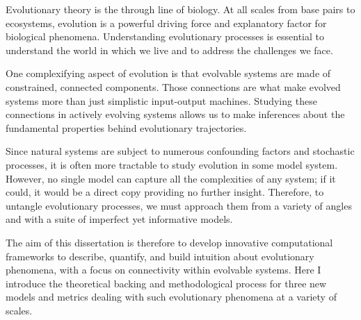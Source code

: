 Evolutionary theory is the through line of biology. At all scales from base pairs to ecosystems, evolution is a powerful driving force and explanatory factor for biological phenomena. Understanding evolutionary processes is essential to understand the world in which we live and to address the challenges we face.

One complexifying aspect of evolution is that evolvable systems are made of constrained, connected components. Those connections are what make evolved systems more than just simplistic input-output machines. Studying these connections in actively evolving systems allows us to make inferences about the fundamental properties behind evolutionary trajectories.

Since natural systems are subject to numerous confounding factors and stochastic processes, it is often more tractable to study evolution in some model system. However, no single model can capture all the complexities of any system; if it could, it would be a direct copy providing no further insight. Therefore, to untangle evolutionary processes, we must approach them from a variety of angles and with a suite of imperfect yet informative models. 

The aim of this dissertation is therefore to develop innovative computational frameworks to describe, quantify, and build intuition about evolutionary phenomena, with a focus on connectivity within evolvable systems. Here I introduce the theoretical backing and methodological process for three new models and metrics dealing with such evolutionary phenomena at a variety of scales.
